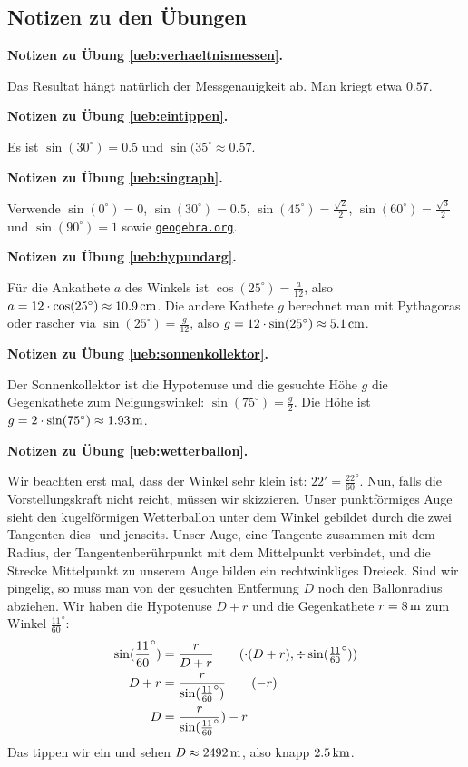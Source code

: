 \documentclass[%
11pt,%
twoside,%
titlepage,%
german,%
headsepline%
]{scrartcl}
\newcommand{\geogebralink}{\href{https://www.geogebra.org/calculator}{\texttt{geogebra.org}}}
\newcommand{\concatueb}[1]{ueb:#1}%
\newcommand{\concatlsg}[1]{lsg:#1}%
\newenvironment{lsg}[1]{%
    \par\noindent\textbf{Notizen zu Übung \ref{\concatueb{#1}}.}%
    \label{\concatlsg{#1}}
}{%
    \par%
}
\begin{document}
\clearpage

\subsection{Notizen zu den \"Ubungen}

\begin{lsg}{verhaeltnismessen}
Das Resultat h\"angt nat\"urlich der Messgenauigkeit ab. Man kriegt etwa $0.57$.
\end{lsg}

\begin{lsg}{eintippen}
Es ist $\sin(30^\circ)=0.5$ und $\sin(35^{\circ}\approx0.57$.
\end{lsg}

\begin{lsg}{singraph}
Verwende $\sin(0^{\circ})=0$, $\sin(30^{\circ})=0.5$, $\sin(45^{\circ})=\frac{\sqrt{2}}{2}$,  $\sin(60^{\circ})=\frac{\sqrt{3}}{2}$ und  $\sin(90^{\circ})=1$ sowie \geogebralink.
\end{lsg}

\begin{lsg}{hypundarg}
F\"ur die Ankathete $a$ des Winkels ist $\cos(25^\circ)=\frac{a}{12}$, also $a=12\cdot\cos(25^\circ)\approx\unit[10.9]{cm}$. Die andere Kathete $g$ berechnet man mit Pythagoras oder rascher via $\sin(25^\circ)=\frac{g}{12}$, also $g=12\cdot\sin(25^\circ)\approx\unit[5.1]{cm}$.
\end{lsg}

\begin{lsg}{sonnenkollektor}
Der Sonnenkollektor ist die Hypotenuse und die gesuchte H\"ohe $g$ die Gegenkathete zum Neigungswinkel: $\sin(75^{\circ})=\frac{g}{2}$. Die H\"ohe ist $g=2\cdot\sin(75^{\circ})\approx\unit[1.93]{m}$.
\end{lsg}

\begin{lsg}{wetterballon}
Wir beachten erst mal, dass der Winkel sehr klein ist: $22'=\frac{22}{60}^{\circ}$. Nun, falls die Vorstellungskraft nicht reicht, m\"ussen wir skizzieren. Unser punktf\"ormiges Auge sieht den kugelf\"ormigen Wetterballon unter dem Winkel gebildet durch die zwei Tangenten dies- und jenseits. Unser Auge, eine Tangente zusammen mit dem Radius, der Tangentenber\"uhrpunkt mit dem Mittelpunkt verbindet, und die Strecke Mittelpunkt zu unserem Auge bilden ein rechtwinkliges Dreieck. Sind wir pingelig, so muss man von der gesuchten Entfernung $D$ noch den Ballonradius abziehen. Wir haben die Hypotenuse $D+r$ und die Gegenkathete $r=\unit[8]{m}$ zum Winkel $\frac{11}{60}^{\circ}$:
\begin{align*}
\sin(\frac{11}{60}^{\circ}) &= \frac{r}{D+r}\tag{$\cdot(D+r), \div\sin(\frac{11}{60}^{\circ})$}\\
D+r &= \frac{r}{\sin(\frac{11}{60}^{\circ})}\tag{$-r$}\\
D &= \frac{r}{\sin(\frac{11}{60}^{\circ}})-r
\end{align*}
Das tippen wir ein und sehen $D\approx\unit[2492]{m}$, also knapp $\unit[2.5]{km}$.
\end{lsg}
\end{document}
